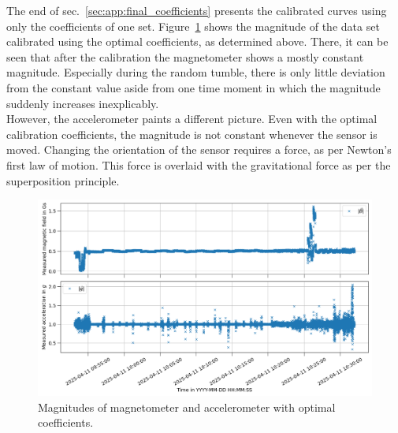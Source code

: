 The end of sec.~\ref{sec:app:final_coefficients} presents the calibrated curves using only the coefficients of one set. Figure~\ref{fig:res:optimal_coeff_magnitude} shows the magnitude of the data set calibrated using the optimal coefficients, as determined above. There, it can be seen that after the calibration the magnetometer shows a mostly constant magnitude. Especially during the random tumble, there is only little deviation from the constant value aside from one time moment in which the magnitude suddenly increases inexplicably.\\
However, the accelerometer paints a different picture. Even with the optimal calibration coefficients, the magnitude is not constant whenever the sensor is moved. Changing the orientation of the sensor requires a force, as per Newton's first law of motion. This force is overlaid with the gravitational force as per the superposition principle.

\begin{figure}[H]
    \centering
    \includegraphics[width=\linewidth]{images/04_calibration/optimal_calibrated_11apr_magnitude.png}
    \caption{Magnitudes of magnetometer and accelerometer with optimal coefficients.}
    \label{fig:res:optimal_coeff_magnitude}
\end{figure}